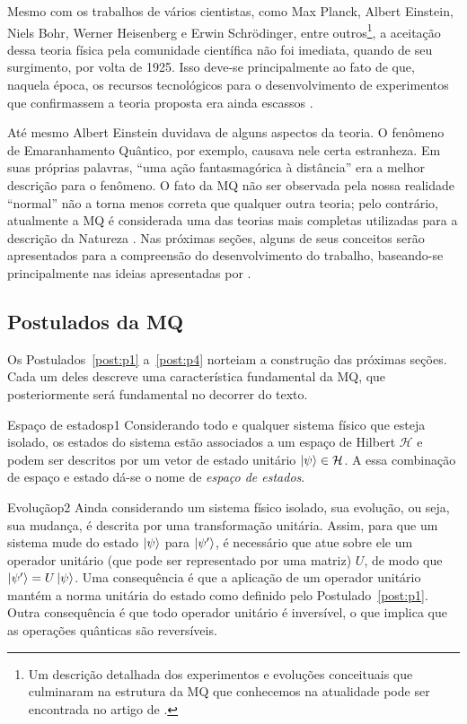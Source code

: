 Mesmo com os trabalhos de vários cientistas, como Max Planck, Albert Einstein, Niels Bohr, Werner Heisenberg e Erwin Schrödinger, entre outros\footnote{Um descrição detalhada dos experimentos e evoluções conceituais que culminaram na estrutura da MQ que conhecemos na atualidade pode ser encontrada no artigo de \textcite{chibeni}.}, a aceitação dessa teoria física pela comunidade científica não foi imediata, quando de seu surgimento, por volta de 1925. Isso deve-se principalmente ao fato de que, naquela época, os recursos tecnológicos para o desenvolvimento de experimentos que confirmassem a teoria proposta era ainda escassos \cite{chibeni}.

Até mesmo Albert Einstein duvidava de alguns aspectos da teoria. O fenômeno de Emaranhamento Quântico, por exemplo, causava nele certa estranheza. Em suas próprias palavras, ``uma ação fantasmagórica à distância'' era a melhor descrição para o fenômeno. O fato da MQ não ser observada pela nossa realidade ``normal'' não a torna menos correta que qualquer outra teoria; pelo contrário, atualmente a MQ é considerada uma das teorias mais completas utilizadas para a descrição da Natureza \cite{chuang}. Nas próximas seções, alguns de seus conceitos serão apresentados para a compreensão do desenvolvimento do trabalho, baseando-se principalmente nas ideias apresentadas por \textcite{chuang,jorcuvich,CompInfoQuantica,grif}.


\subsection{Postulados da MQ}\label{sec:postulados}

Os Postulados~\ref{post:p1} a~\ref{post:p4} norteiam a construção das próximas seções. Cada um deles descreve uma característica fundamental da MQ, que posteriormente será fundamental no decorrer do texto.

\begin{post}{Espaço de estados}{p1}
Considerando todo e qualquer sistema físico que esteja isolado, os estados do sistema estão associados a um espaço de Hilbert $\mathcal{H}$ e podem ser descritos por um vetor de estado unitário $\ket{\psi} \in \mathcal{H}$. A essa combinação de espaço e estado dá-se o nome de \textit{espaço de estados}.
\end{post}

\begin{post}{Evolução}{p2}
Ainda considerando um sistema físico isolado, sua evolução, ou seja, sua mudança, é descrita por uma transformação unitária. Assim, para que um sistema mude do estado $\ket{\psi}$ para $\ket{\psi'}$, é necessário que atue sobre ele um operador unitário (que pode ser representado por uma matriz) \(U\), de modo que $\ket{\psi'}=U\ket{\psi}$. Uma consequência é que a aplicação de um operador unitário mantém a norma unitária do estado como definido pelo Postulado~\ref{post:p1}. Outra consequência é que todo operador unitário é inversível, o que implica que as operações quânticas são reversíveis.
\end{post}

